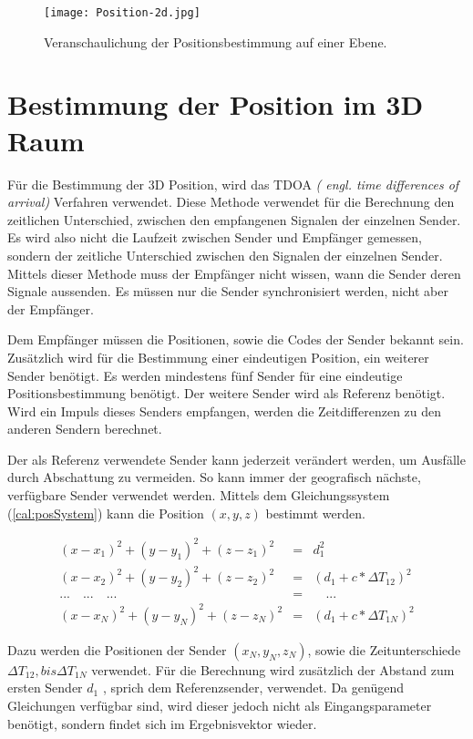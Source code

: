\begin{figure}[H]
\centering
\texttt{[image: Position-2d.jpg]}
\caption{Veranschaulichung der Positionsbestimmung auf einer Ebene. \cite{ImgPosition}}
\label{fig:2dposition}
\end{figure}

\section{Bestimmung der Position im 3D Raum}
Für die Bestimmung der 3D Position, wird das TDOA \emph{( engl. time differences of arrival)} Verfahren verwendet. Diese Methode verwendet für die Berechnung den zeitlichen Unterschied, zwischen den empfangenen Signalen der einzelnen Sender. Es wird also nicht die Laufzeit zwischen Sender und Empfänger gemessen, sondern der zeitliche Unterschied zwischen den  Signalen der einzelnen Sender. Mittels dieser Methode muss der Empfänger nicht wissen, wann die Sender deren Signale aussenden. Es müssen nur die Sender synchronisiert werden, nicht aber der Empfänger.

Dem Empfänger müssen die Positionen, sowie die Codes der Sender bekannt sein. Zusätzlich wird für die Bestimmung einer eindeutigen Position, ein weiterer Sender benötigt. Es werden mindestens fünf Sender für eine eindeutige Positionsbestimmung benötigt. Der weitere Sender wird als Referenz benötigt. Wird ein Impuls dieses Senders empfangen, werden die Zeitdifferenzen zu den anderen Sendern berechnet. 

Der als Referenz verwendete Sender kann jederzeit verändert werden, um Ausfälle durch Abschattung zu vermeiden. So kann immer der geografisch nächste, verfügbare Sender verwendet werden. Mittels dem Gleichungssystem (\ref{cal:posSystem}) kann die Position $(x,y,z)$ bestimmt werden.

\begin{eqnarray}
	(x - x_{1})^{2} + (y - y_{1})^{2} + (z - z_{1})^{2} &=& d_{1}^{2} \nonumber  \\
	(x - x_{2})^{2} + (y - y_{2})^{2} + (z - z_{2})^{2} &=& (d_{1} + c* \Delta T_{12})^{2} \nonumber  \\
								... \quad ... \quad ... &=& \quad ... \nonumber  \\
	(x - x_{N})^{2} + (y - y_{N})^{2} + (z - z_{N})^{2} &=& (d_{1} + c* \Delta T_{1N})^{2}
	\label{cal:posSystem}
\end{eqnarray}

Dazu werden die Positionen der Sender $(x_N,y_N,z_N)$, sowie die Zeitunterschiede $\Delta T_{12}, bis \Delta T_{1N}$ verwendet. Für die Berechnung wird zusätzlich der Abstand zum ersten Sender $d_1$ , sprich dem Referenzsender, verwendet. Da genügend Gleichungen verfügbar sind, wird dieser jedoch nicht als Eingangsparameter benötigt, sondern findet sich im Ergebnisvektor wieder.

